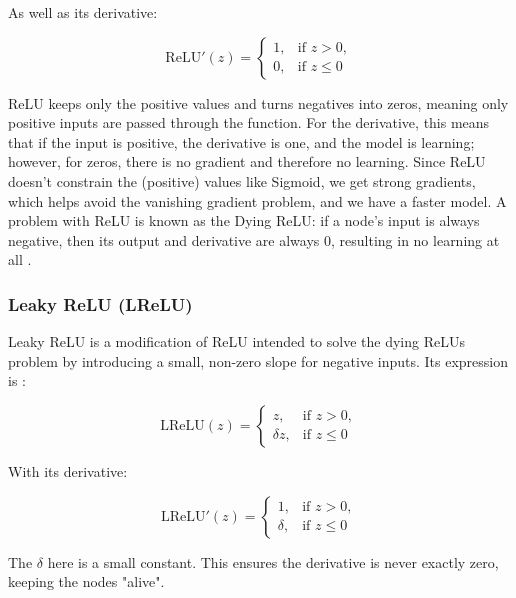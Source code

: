 \documentclass[amssymb,twocolumn,aps,floatfix]{revtex4-2}
\begin{document}
As well as its derivative: 

\begin{equation}
    \text{ReLU}'(z) =
\begin{cases}
1, & \text{if } z > 0,\\[6pt]
0, & \text{if } z \le 0
\end{cases}
\end{equation}

ReLU keeps only the positive values and turns negatives into zeros, meaning only positive inputs are passed through the function. For the derivative, this means that if the input is positive, the derivative is one, and the model is learning; however, for zeros, there is no gradient and therefore no learning. Since ReLU doesn't constrain the (positive) values like Sigmoid, we get strong gradients, which helps avoid the vanishing gradient problem, and we have a faster model. A problem with ReLU is known as the Dying ReLU: if a node's input is always negative, then its output and derivative are always 0, resulting in no learning at all \cite{hjorthjensen_week42_misc}. 

\subsubsection{Leaky ReLU (LReLU)}

Leaky ReLU is a modification of ReLU intended to solve the dying ReLUs problem by introducing a small, non-zero slope for negative inputs. Its expression is \cite{hjorthjensen_week42_misc} \cite{hjorthjensen_week43_misc}: 

\begin{equation}
    \text{LReLU}(z) =
\begin{cases}
z, & \text{if } z > 0,\\[6pt]
\delta z, & \text{if } z \le 0
\end{cases}
\end{equation}

With its derivative: 

\begin{equation}
    \text{LReLU}'(z) =
\begin{cases}
1, & \text{if } z > 0,\\[6pt]
\delta, & \text{if } z \le 0
\end{cases}
\end{equation}

The $\delta$ here is a small constant. This ensures the derivative is never exactly zero, keeping the nodes "alive". 
\end{document}

